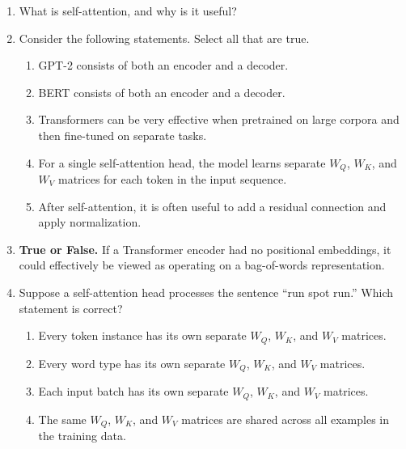 \begin{enumerate}[label=(\alph*)]
\item What is self-attention, and why is it useful?

\item Consider the following statements. Select all that are true.
\begin{enumerate}[label=\alph*.]
\item GPT-2 consists of both an encoder and a decoder.
\item BERT consists of both an encoder and a decoder.
\item Transformers can be very effective when pretrained on large corpora and then fine-tuned on separate tasks.
\item For a single self-attention head, the model learns separate \(W_Q\), \(W_K\), and \(W_V\) matrices for each token in the input sequence.
\item After self-attention, it is often useful to add a residual connection and apply normalization.
\end{enumerate}

\item \textbf{True or False.} If a Transformer encoder had no positional embeddings, it could effectively be viewed as operating on a bag-of-words representation.

\item Suppose a self-attention head processes the sentence ``run spot run.'' Which statement is correct?
\begin{enumerate}[label=\alph*.]
\item Every token instance has its own separate \(W_Q\), \(W_K\), and \(W_V\) matrices.
\item Every word type has its own separate \(W_Q\), \(W_K\), and \(W_V\) matrices.
\item Each input batch has its own separate \(W_Q\), \(W_K\), and \(W_V\) matrices.
\item The same \(W_Q\), \(W_K\), and \(W_V\) matrices are shared across all examples in the training data.
\end{enumerate}


\end{enumerate}
